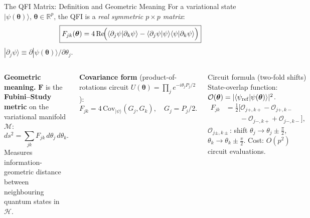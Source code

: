 \documentclass[aspectratio=169,10pt]{beamer}
\newcommand{\btheta}{\boldsymbol{\theta}}
\newcommand{\QFI}{\mathbf{F}}
\newcommand{\manifold}{\mathcal{M}}
\newcommand{\R}{\mathbb{R}}
\newcommand{\hilb}{\mathcal{H}}
\begin{document}
\begin{frame}{The QFI Matrix: Definition and Geometric Meaning}
\small
  For a variational state $|\psi(\btheta)\rangle$,
  $\btheta\in\R^p$, the QFI is a
  \emph{real symmetric $p\times p$ matrix}:
  \[
    \boxed{
      F_{jk}(\btheta)
      = 4\,\mathrm{Re}\!\Bigl(
          \langle\partial_j\psi|\partial_k\psi\rangle
         -\langle\partial_j\psi|\psi\rangle
          \langle\psi|\partial_k\psi\rangle
        \Bigr)
    }
  \]
  $|\partial_j\psi\rangle
    \equiv \partial|\psi(\btheta)\rangle/\partial\theta_j$.

  \begin{columns}[T]
    \textbf{Geometric meaning.}
    $\QFI$ is the \textbf{Fubini--Study metric}
    on the variational manifold $\manifold$:
    \[
      ds^2 = \sum_{jk} F_{jk}\,d\theta_j\,d\theta_k.
    \]
    Measures information-geometric distance between
    neighbouring quantum states in $\hilb$.

    \medskip
    \textbf{Covariance form}
    (product-of-rotations circuit
    $U(\btheta)=\prod_j e^{-i\theta_j P_j/2}$):
    \[
      F_{jk} = 4\,\mathrm{Cov}_{|\psi\rangle}(G_j, G_k),
      \quad G_j = P_j/2.
    \]
    \begin{block}{Circuit formula (two-fold shifts)}
      State-overlap function:
      $\mathcal{O}(\btheta)
        = |\langle\psi_{\rm ref}|\psi(\btheta)\rangle|^2$.
      \begin{align*}
        F_{jk} &= \tfrac12\bigl[
          \mathcal{O}_{j+,k+}
         -\mathcal{O}_{j+,k-}\\
         &\qquad -\mathcal{O}_{j-,k+}
         +\mathcal{O}_{j-,k-}\bigr],
      \end{align*}
      $\mathcal{O}_{j\pm,k\pm}$: shift
      $\theta_j\to\theta_j\pm\tfrac\pi2$,
      $\theta_k\to\theta_k\pm\tfrac\pi2$.
      Cost: $O(p^2)$ circuit evaluations.
    \end{block}
  \end{columns}
\end{frame}
\end{document}
